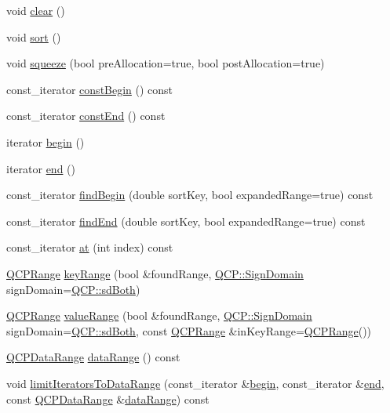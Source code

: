 \begin{DoxyCompactItemize}
\item 
void \hyperlink{classQCPDataContainer_a7e2b29736c6fd761649bda1a54ba967f}{clear} ()
\item 
void \hyperlink{classQCPDataContainer_a75da92e33063b63d6da5014683591d45}{sort} ()
\item 
void \hyperlink{classQCPDataContainer_a82fcc511def22287fc62579d0706387c}{squeeze} (bool pre\+Allocation=true, bool post\+Allocation=true)
\item 
const\+\_\+iterator \hyperlink{classQCPDataContainer_a49d7622999e2de67fa2331626a3159aa}{const\+Begin} () const
\item 
const\+\_\+iterator \hyperlink{classQCPDataContainer_aa7f7cf239b85b1a28de3d675cc5b3da1}{const\+End} () const
\item 
iterator \hyperlink{classQCPDataContainer_a80032518413ab8f418f7c81182fd06cb}{begin} ()
\item 
iterator \hyperlink{classQCPDataContainer_acf66dfad83fe041380f5e0491e7676f2}{end} ()
\item 
const\+\_\+iterator \hyperlink{classQCPDataContainer_a2ad8a5399072d99a242d3a6d2d7e278a}{find\+Begin} (double sort\+Key, bool expanded\+Range=true) const
\item 
const\+\_\+iterator \hyperlink{classQCPDataContainer_afb8b8f23cc2b7234a793a25ce79fe48f}{find\+End} (double sort\+Key, bool expanded\+Range=true) const
\item 
const\+\_\+iterator \hyperlink{classQCPDataContainer_ae90c7457a052b223539906e6bddc0a92}{at} (int index) const
\item 
\hyperlink{classQCPRange}{Q\+C\+P\+Range} \hyperlink{classQCPDataContainer_aba6e1a93c21ccc56a432b4a02c9d0ed2}{key\+Range} (bool \&found\+Range, \hyperlink{namespaceQCP_afd50e7cf431af385614987d8553ff8a9}{Q\+C\+P\+::\+Sign\+Domain} sign\+Domain=\hyperlink{namespaceQCP_afd50e7cf431af385614987d8553ff8a9aa38352ef02d51ddfa4399d9551566e24}{Q\+C\+P\+::sd\+Both})
\item 
\hyperlink{classQCPRange}{Q\+C\+P\+Range} \hyperlink{classQCPDataContainer_a35a102dc2424d1228fc374d9313efbe9}{value\+Range} (bool \&found\+Range, \hyperlink{namespaceQCP_afd50e7cf431af385614987d8553ff8a9}{Q\+C\+P\+::\+Sign\+Domain} sign\+Domain=\hyperlink{namespaceQCP_afd50e7cf431af385614987d8553ff8a9aa38352ef02d51ddfa4399d9551566e24}{Q\+C\+P\+::sd\+Both}, const \hyperlink{classQCPRange}{Q\+C\+P\+Range} \&in\+Key\+Range=\hyperlink{classQCPRange}{Q\+C\+P\+Range}())
\item 
\hyperlink{classQCPDataRange}{Q\+C\+P\+Data\+Range} \hyperlink{classQCPDataContainer_aece90eeb2ba8d3c46d3d94023630fbc7}{data\+Range} () const
\item 
void \hyperlink{classQCPDataContainer_aa1b36f5ae86a5a5a0b92141d3a0945c4}{limit\+Iterators\+To\+Data\+Range} (const\+\_\+iterator \&\hyperlink{classQCPDataContainer_a80032518413ab8f418f7c81182fd06cb}{begin}, const\+\_\+iterator \&\hyperlink{classQCPDataContainer_acf66dfad83fe041380f5e0491e7676f2}{end}, const \hyperlink{classQCPDataRange}{Q\+C\+P\+Data\+Range} \&\hyperlink{classQCPDataContainer_aece90eeb2ba8d3c46d3d94023630fbc7}{data\+Range}) const
\end{DoxyCompactItemize}
